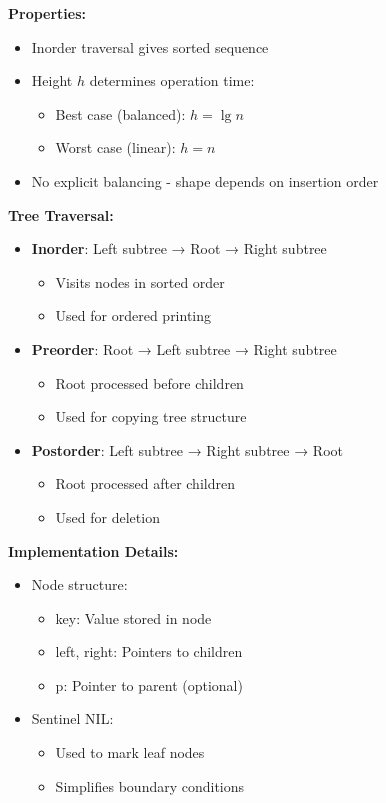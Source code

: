 \textbf{Properties:}
\begin{itemize}[noitemsep,leftmargin=*]
    \item Inorder traversal gives sorted sequence
    \item Height $h$ determines operation time:
        \begin{itemize}[noitemsep,topsep=0pt]
            \item Best case (balanced): $h = \lg n$
            \item Worst case (linear): $h = n$
        \end{itemize}
    \item No explicit balancing - shape depends on insertion order
\end{itemize}

\textbf{Tree Traversal:}
\begin{itemize}[noitemsep,leftmargin=*]
    \item \textbf{Inorder}: Left subtree → Root → Right subtree
        \begin{itemize}[noitemsep,topsep=0pt]
            \item Visits nodes in sorted order
            \item Used for ordered printing
        \end{itemize}
    \item \textbf{Preorder}: Root → Left subtree → Right subtree
        \begin{itemize}[noitemsep,topsep=0pt]
            \item Root processed before children
            \item Used for copying tree structure
        \end{itemize}
    \item \textbf{Postorder}: Left subtree → Right subtree → Root
        \begin{itemize}[noitemsep,topsep=0pt]
            \item Root processed after children
            \item Used for deletion
        \end{itemize}
\end{itemize}

\textbf{Implementation Details:}
\begin{itemize}[noitemsep,leftmargin=*]
    \item Node structure:
        \begin{itemize}[noitemsep,topsep=0pt]
            \item key: Value stored in node
            \item left, right: Pointers to children
            \item p: Pointer to parent (optional)
        \end{itemize}
    \item Sentinel NIL:
        \begin{itemize}[noitemsep,topsep=0pt]
            \item Used to mark leaf nodes
            \item Simplifies boundary conditions
        \end{itemize}
\end{itemize}

